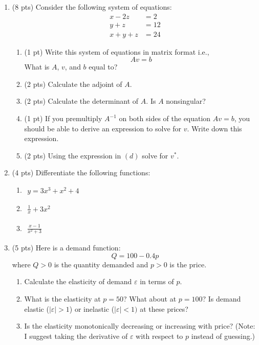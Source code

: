 \documentclass{./../../Latex/tests}
\begin{document}
\begin{enumerate}
\item (8 pts) Consider the following system of equations:
\begin{align*}
x-2z & = 2 \\
y+z & = 12 \\
x+y+z &= 24	
\end{align*}
\begin{enumerate}
  \item (1 pt) Write this system of equations in matrix format i.e., $$ Av=b $$
  What is $A$, $v$, and $b$ equal to?
  \newpage
   \item (2 pts) Calculate the adjoint of $A$. \vspace{8.5cm}
  \item (2 pts) Calculate the determinant of $A$. Is $A$ nonsingular? \vspace{4.5cm}
  \item (1 pt) If you premultiply $A^{-1}$ on both sides of the equation $ Av=b $, you should be able to derive an expression to solve for $v$. Write down this expression. \vspace{2cm}
  \item (2 pts) Using the expression in $(d)$ solve for $v^*$. 
\end{enumerate}

\newpage
\item (4 pts) Differentiate the following functions:
\begin{enumerate}
\item $ \begin{aligned} y = 3x^3+x^2+4 \end{aligned} $ \vspace{2cm}
  \item $ \begin{aligned} \frac{1}{x}+3x^2 \end{aligned} $ \vspace{2cm}
  \item $\begin{aligned} \frac{x-1}{x^2+3} \end{aligned}$ \vspace{2cm}
\end{enumerate}


\vspace{1cm}

\item (5 pts) Here is a demand function:
 $$ Q = 100-0.4p$$
 where $Q>0$ is the quantity demanded and $p>0$ is the price. 
 \begin{enumerate}
  \item  Calculate the elasticity of demand $\varepsilon$ in terms of $p$. \vspace{3.5cm}
  \item What is the elasticity at $p=50$? What about at $p=100$? Is demand elastic ($|\varepsilon|>1$) or inelastic ($|\varepsilon|<1)$ at these prices? \newpage
  \item Is the elasticity monotonically decreasing or increasing with price? (Note: I suggest taking the derivative of $\varepsilon$ with respect to $p$ instead of guessing.)\vspace{4.5cm}
\end{enumerate}


\end{enumerate}
\end{document}
